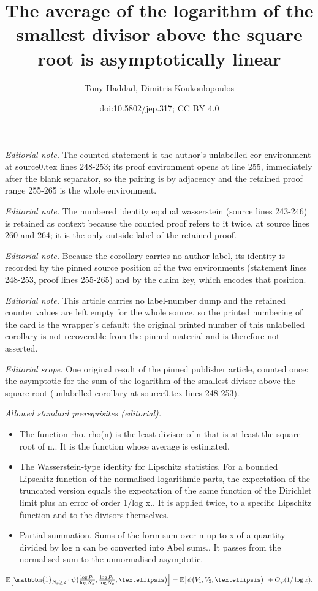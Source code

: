 \documentclass[10pt,a4paper]{article}
\title{The average of the logarithm of the smallest divisor above the square root is asymptotically linear}
\author{Tony Haddad, Dimitris Koukoulopoulos}
\date{doi:10.5802/jep.317; CC BY 4.0}
\newcommand{\EE}{\mathbb{E}}
\newcommand{\one}{\mathbbm{1}}
\newcommand{\bg}{\big}
\newcommand{\bgg}{\Big}
\theoremstyle{plain}
\theoremstyle{definition}
\begin{document}
\maketitle
\noindent\textit{Editorial note.} The counted statement is the author's unlabelled cor environment at source0.tex lines 248-253; its proof environment opens at line 255, immediately after the blank separator, so the pairing is by adjacency and the retained proof range 255-265 is the whole environment.\par\medskip
\noindent\textit{Editorial note.} The numbered identity eq:dual wasserstein (source lines 243-246) is retained as context because the counted proof refers to it twice, at source lines 260 and 264; it is the only outside label of the retained proof.\par\medskip
\noindent\textit{Editorial note.} Because the corollary carries no author label, its identity is recorded by the pinned source position of the two environments (statement lines 248-253, proof lines 255-265) and by the claim key, which encodes that position.\par\medskip
\noindent\textit{Editorial note.} This article carries no label-number dump and the retained counter values are left empty for the whole source, so the printed numbering of the card is the wrapper's default; the original printed number of this unlabelled corollary is not recoverable from the pinned material and is therefore not asserted.\par\medskip
\noindent\textit{Editorial scope.} One original result of the pinned publisher article, counted once: the asymptotic for the sum of the logarithm of the smallest divisor above the square root (unlabelled corollary at source0.tex lines 248-253).\par\medskip
\noindent\textit{Allowed standard prerequisites (editorial).}\begin{itemize}
\item The function rho. rho(n) is the least divisor of n that is at least the square root of n.. It is the function whose average is estimated.
\item The Wasserstein-type identity for Lipschitz statistics. For a bounded Lipschitz function of the normalised logarithmic parts, the expectation of the truncated version equals the expectation of the same function of the Dirichlet limit plus an error of order 1/log x.. It is applied twice, to a specific Lipschitz function and to the divisors themselves.
\item Partial summation. Sums of the form sum over n up to x of a quantity divided by log n can be converted into Abel sums.. It passes from the normalised sum to the unnormalised asymptotic.
\end{itemize}\medskip
\begin{equation}
\label{eq:dual wasserstein}
\EE\bgg[\one_{N_x \ge 2}\cdot \psi\bg(\tfrac{\log P_1}{\log N_x}, \tfrac{\log P_2}{\log N_x}, \ldots\bg)\bgg] = \EE\bg[\psi\bg(V_1, V_2, \ldots\bg)\bg] + O_\psi(1/\log x).
\end{equation}
\end{document}
